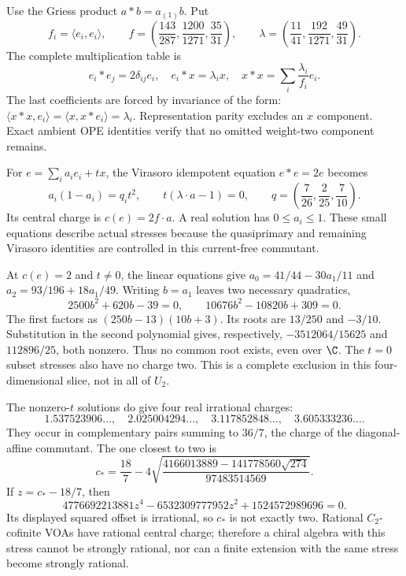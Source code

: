 Use the Griess product $a*b=a_{(1)}b$. Put
\[
 f_i=\langle e_i,e_i\rangle,
 \qquad f=\left(\frac{143}{287},\frac{1200}{1271},\frac{35}{31}\right),
 \qquad\lambda=\left(\frac{11}{41},\frac{192}{1271},\frac{49}{31}\right).
\]
The complete multiplication table is
\begin{equation}\label{eq:c-axis-table}
 e_i*e_j=2\delta_{ij}e_i,
 \quad e_i*x=\lambda_i x,
 \quad x*x=\sum_i\frac{\lambda_i}{f_i}e_i.
\end{equation}
The last coefficients are forced by invariance of the form:
$\langle x*x,e_i\rangle=\langle x,x*e_i\rangle=\lambda_i$.
Representation parity excludes an $x$ component. Exact ambient OPE
identities verify that no omitted weight-two component remains.

For $e=\sum_i a_ie_i+tx$, the Virasoro idempotent equation $e*e=2e$
becomes
\begin{equation}\label{eq:c-axis-equations}
 a_i(1-a_i)=q_it^2,\qquad
 t(\lambda\cdot a-1)=0,
 \qquad q=\left(\frac7{26},\frac2{25},\frac7{10}\right).
\end{equation}
Its central charge is $c(e)=2f\cdot a$. A real solution has
$0\leq a_i\leq1$. These small equations describe actual stresses
because the quasiprimary and remaining Virasoro identities are
controlled in this current-free commutant.

At $c(e)=2$ and $t\ne0$, the linear equations give
$a_0=41/44-30a_1/11$ and $a_2=93/196+18a_1/49$.
Writing $b=a_1$ leaves two necessary quadratics,
\[
 2500b^2+620b-39=0,
 \qquad10676b^2-10820b+309=0.
\]
The first factors as $(250b-13)(10b+3)$. Its roots are $13/250$
and $-3/10$. Substitution in the second polynomial gives, respectively,
$-3512064/15625$ and $112896/25$, both nonzero. Thus no common
root exists, even over $\C$. The $t=0$ subset stresses also have
no charge two. This is a complete exclusion in this four-dimensional
slice, not in all of $U_2$.

The nonzero-$t$ solutions do give four real irrational charges:
\[
 1.537523906\ldots,\quad2.025004294\ldots,
 \quad3.117852848\ldots,\quad3.605333236\ldots.
\]
They occur in complementary pairs summing to $36/7$, the charge of
the diagonal-affine commutant. The one closest to two is
\begin{equation}\label{eq:c-cstar}
 c_*=\frac{18}{7}
 -4\sqrt{\frac{4166013889-141778560\sqrt{274}}{97483514569}}.
\end{equation}
If $z=c_*-18/7$, then
\[
 4776692213881z^4-6532309777952z^2+1524572989696=0.
\]
Its displayed squared offset is irrational, so $c_*$ is not exactly
two. Rational $C_2$-cofinite VOAs have rational central charge;
therefore a chiral algebra with this stress cannot be strongly
rational, nor can a finite extension with the same stress become
strongly rational.

